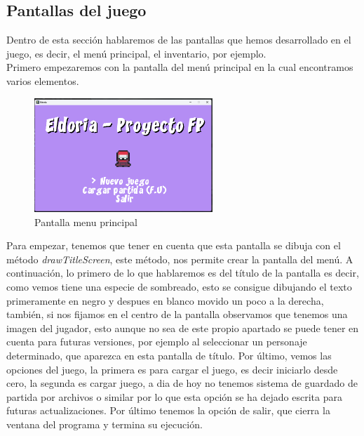 \documentclass[a4paper]{article}
\begin{document}
\clearpage

\subsection{Pantallas del juego}
Dentro de esta sección hablaremos de las pantallas que hemos desarrollado en el juego, es decir, el menú principal, el inventario, por ejemplo.\\
Primero empezaremos con la pantalla del menú principal en la cual encontramos varios elementos.\\
\begin{figure}[!ht]
    \centering
    \includegraphics[width=0.6\textwidth]{Images/pantalla1tfg.png}
    \caption{Pantalla menu principal}
    \label{fig:pantalla1}
\end{figure}
Para empezar, tenemos que tener en cuenta que esta pantalla se dibuja con el método \textit{drawTitleScreen}, este método, nos permite crear la pantalla del menú. A continuación, lo primero de lo que hablaremos es del título de la pantalla
es decir, como vemos tiene una especie de sombreado, esto se consigue dibujando el texto primeramente en negro y despues en blanco movido un poco a la derecha, también, si nos fijamos en el centro de la pantalla observamos que tenemos una imagen del jugador,
esto aunque no sea de este propio apartado se puede tener en cuenta para futuras versiones, por ejemplo al seleccionar un personaje determinado, que aparezca en esta pantalla de título. Por último, vemos las opciones del juego, la primera es para cargar el juego, es decir
iniciarlo desde cero, la segunda es cargar juego, a dia de hoy no tenemos sistema de guardado de partida por archivos o similar por lo que esta opción se ha dejado escrita para futuras actualizaciones. Por último tenemos la opción de salir, que cierra la ventana del programa y termina su ejecución.\\
\end{document}
